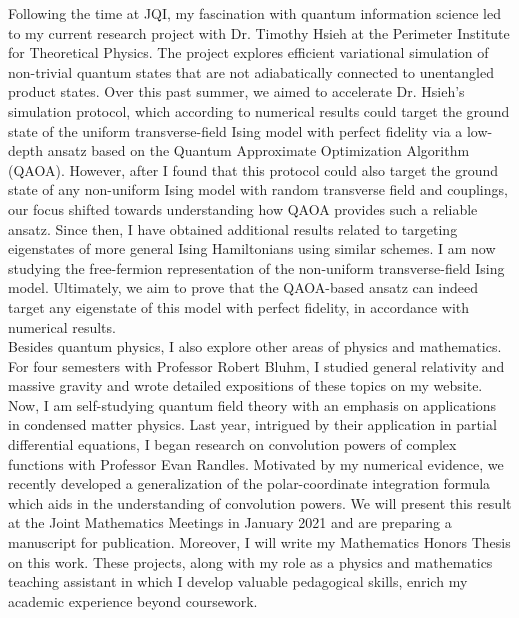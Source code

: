 Following the time at JQI, my fascination with quantum information science led to my current research project with Dr. Timothy Hsieh at the Perimeter Institute for Theoretical Physics. The project explores efficient variational simulation of non-trivial quantum states that are not adiabatically connected to unentangled product states. Over this past summer, we aimed to accelerate Dr. Hsieh's simulation protocol, which according to numerical results could target the ground state of the uniform transverse-field Ising model with perfect fidelity via a low-depth ansatz based on the Quantum Approximate Optimization Algorithm (QAOA). However, after I found that this protocol could also target the ground state of any non-uniform Ising model with random transverse field and couplings, our focus shifted towards understanding how QAOA provides such a reliable ansatz. Since then, I have obtained additional results related to targeting eigenstates of more general Ising Hamiltonians using similar schemes. I am now studying the free-fermion representation of the non-uniform transverse-field Ising model. Ultimately, we aim to prove that the QAOA-based ansatz can indeed target any eigenstate of this model with perfect fidelity, in accordance with numerical results.  \\

Besides quantum physics, I also explore other areas of physics and mathematics. For four semesters with Professor Robert Bluhm, I studied general relativity and massive gravity and wrote detailed expositions of these topics on my website. Now, I am self-studying quantum field theory with an emphasis on applications in condensed matter physics. Last year, intrigued by their application in partial differential equations, I began research on convolution powers of complex functions with Professor Evan Randles. Motivated by my numerical evidence, we recently developed a generalization of the polar-coordinate integration formula which aids in the understanding of convolution powers. We will present this result at the Joint Mathematics Meetings in January 2021 and are preparing a manuscript for publication. Moreover, I will write my Mathematics Honors Thesis on this work. These projects, along with my role as a physics and mathematics teaching assistant in which I develop valuable pedagogical skills, enrich my academic experience beyond coursework. \\ 



